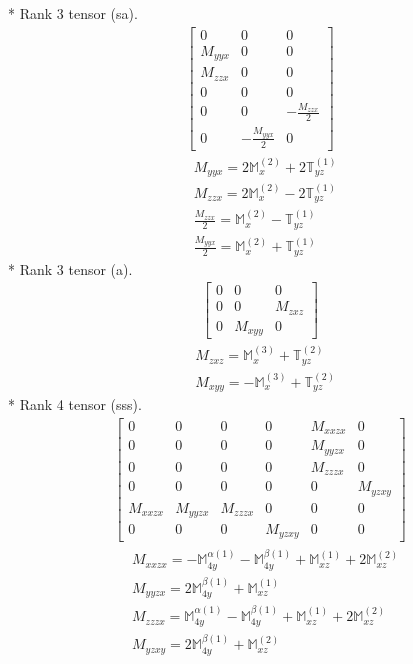\documentclass[fleqn,8pt,landscape]{jsarticle}
\begin{document}
* Rank 3 tensor (sa).
\begin{align*}
\begin{bmatrix} 0 & 0 & 0 \\ M_{yyx} & 0 & 0 \\ M_{zzx} & 0 & 0 \\ 0 & 0 & 0 \\ 0 & 0 & - \frac{M_{zzx}}{2} \\ 0 & - \frac{M_{yyx}}{2} & 0 \end{bmatrix}
\end{align*}
\begin{align*}
& M_{yyx} = 2 \mathbb{M}_{x}^{(2)} + 2 \mathbb{T}_{yz}^{(1)} \\
& M_{zzx} = 2 \mathbb{M}_{x}^{(2)} - 2 \mathbb{T}_{yz}^{(1)} \\
& \frac{M_{zzx}}{2} = \mathbb{M}_{x}^{(2)} - \mathbb{T}_{yz}^{(1)} \\
& \frac{M_{yyx}}{2} = \mathbb{M}_{x}^{(2)} + \mathbb{T}_{yz}^{(1)}
\end{align*}
* Rank 3 tensor (a).
\begin{align*}
\begin{bmatrix} 0 & 0 & 0 \\ 0 & 0 & M_{zxz} \\ 0 & M_{xyy} & 0 \end{bmatrix}
\end{align*}
\begin{align*}
& M_{zxz} = \mathbb{M}_{x}^{(3)} + \mathbb{T}_{yz}^{(2)} \\
& M_{xyy} = - \mathbb{M}_{x}^{(3)} + \mathbb{T}_{yz}^{(2)}
\end{align*}
* Rank 4 tensor (sss).
\begin{align*}
\begin{bmatrix} 0 & 0 & 0 & 0 & M_{xxzx} & 0 \\ 0 & 0 & 0 & 0 & M_{yyzx} & 0 \\ 0 & 0 & 0 & 0 & M_{zzzx} & 0 \\ 0 & 0 & 0 & 0 & 0 & M_{yzxy} \\ M_{xxzx} & M_{yyzx} & M_{zzzx} & 0 & 0 & 0 \\ 0 & 0 & 0 & M_{yzxy} & 0 & 0 \end{bmatrix}
\end{align*}
\begin{align*}
& M_{xxzx} = - \mathbb{M}_{4y}^{\alpha(1)} - \mathbb{M}_{4y}^{\beta(1)} + \mathbb{M}_{xz}^{(1)} + 2 \mathbb{M}_{xz}^{(2)} \\
& M_{yyzx} = 2 \mathbb{M}_{4y}^{\beta(1)} + \mathbb{M}_{xz}^{(1)} \\
& M_{zzzx} = \mathbb{M}_{4y}^{\alpha(1)} - \mathbb{M}_{4y}^{\beta(1)} + \mathbb{M}_{xz}^{(1)} + 2 \mathbb{M}_{xz}^{(2)} \\
& M_{yzxy} = 2 \mathbb{M}_{4y}^{\beta(1)} + \mathbb{M}_{xz}^{(2)}
\end{align*}
\end{document}
